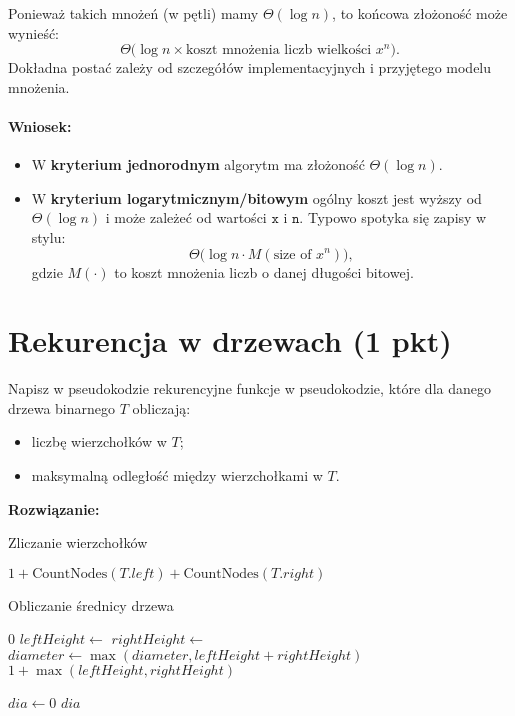 \documentclass[12pt]{article}
\begin{document}
Ponieważ takich mnożeń (w pętli) mamy \(\Theta(\log n)\), to końcowa złożoność może wynieść:
\[
\Theta\bigl(\log n \times \text{koszt mnożenia liczb wielkości } x^n\bigr).
\]
Dokładna postać zależy od szczegółów implementacyjnych i przyjętego modelu mnożenia. 

\paragraph{Wniosek:}
\begin{itemize}
    \item W \textbf{kryterium jednorodnym} algorytm ma złożoność \(\Theta(\log n)\).
    \item W \textbf{kryterium logarytmicznym/bitowym} ogólny koszt jest wyższy od \(\Theta(\log n)\) i może zależeć od wartości \(\texttt{x}\) i \(\texttt{n}\). Typowo spotyka się zapisy w stylu:
    \[
      \Theta\bigl(\log n \cdot M(\text{size of }x^n)\bigr),
    \]
    gdzie \(M(\cdot)\) to koszt mnożenia liczb o danej długości bitowej.
\end{itemize}

\newpage
	\section{Rekurencja w drzewach (1 pkt)}
	Napisz w pseudokodzie rekurencyjne funkcje w pseudokodzie, które dla danego
	drzewa binarnego $T$ obliczają:
	\begin{itemize}
		\item liczbę wierzchołków w $T$;

		\item maksymalną odległość między wierzchołkami w $T$.
	\end{itemize}
	\textcolor{tokyoNightGreen}{\textbf{\large Rozwiązanie:}}
	\vspace{1em}
	\begin{algorithm}
	    \caption{Zliczanie wierzchołków}
        \begin{algorithmic}[1]
          \State {} \Else
		\State \Return $1 + \text{CountNodes}(T.left) + \text{CountNodes}(T.right)$
		\EndIf \EndFunction
    \end{algorithmic}
    \end{algorithm}
\begin{algorithm}
    \caption{Obliczanie średnicy drzewa}
    \begin{algorithmic}[1]
                \State \Return $0$
            \EndIf
            \State $leftHeight \gets$ 
            \State $rightHeight \gets$ 
            \State $diameter \gets \max(diameter, leftHeight + rightHeight)$
            \State \Return $1 + \max(leftHeight, rightHeight)$
        \EndFunction
        
            \State $dia \gets 0$
            \State {}
            \State \Return $dia$
        \EndFunction
    \end{algorithmic}
\end{algorithm}
\newpage
\end{document}

